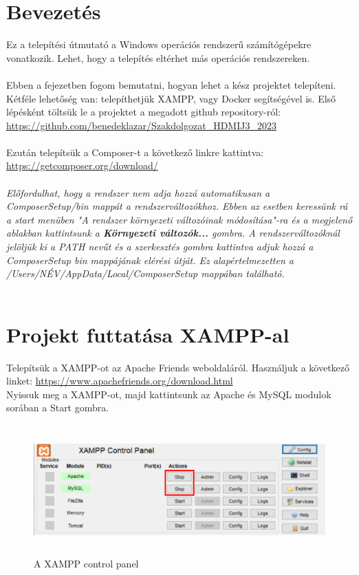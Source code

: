 \documentclass[
]{thesis-ekf}
\theoremstyle{definition}
\theoremstyle{remark}
\begin{document}
\section{Bevezetés}
Ez a telepítési útmutató a Windows operációs rendszerű számítógépekre vonatkozik. Lehet, hogy a telepítés eltérhet más operációs rendszereken.
\\\\
Ebben a fejezetben fogom bemutatni, hogyan lehet a kész projektet telepíteni. Kétféle lehetőség van: telepíthetjük XAMPP, vagy Docker segítségével is.
\noindent
Első lépésként töltsük le a projektet a megadott github repository-ról:
\noindent
\vspace{3mm}
\\
\url{ https://github.com/benedeklazar/Szakdolgozat_HDMIJ3_2023}
\\
\vspace{2mm}
\\
\noindent
Ezután telepítsük a Composer-t a következő linkre kattintva:
\noindent
\vspace{3mm}
\\
\url{ https://getcomposer.org/download/}
\\
\vspace{2mm}
\\
\noindent
\textit{Előfordulhat, hogy a rendszer nem adja hozzá automatikusan a ComposerSetup/bin mappát a rendszerváltozókhoz. Ebben az esetben keressünk rá a start menüben "A rendszer környezeti változóinak módosítása"-ra és
a megjelenő ablakban kattintsunk a \textbf{Környezeti változók...} gombra.
A rendszerváltozóknál jelöljük ki a PATH nevűt és a szerkesztés gombra kattintva adjuk hozzá a ComposerSetup bin mappájának elérési útját. Ez alapértelmezetten a /Users/NÉV/AppData/Local/ComposerSetup mappában található.}
\\\\

\section{Projekt futtatása XAMPP-al}

Telepítsük a XAMPP-ot az Apache Friends weboldaláról. Használjuk a következő linket: \url{https://www.apachefriends.org/download.html}
\\
Nyissuk meg a XAMPP-ot, majd kattintsunk az Apache és MySQL modulok sorában a Start gombra.

\begin{figure}[H]
	\centering
	\includegraphics[width=13cm, height=5cm]{xampp}
	\caption{A XAMPP control panel}
	\label{fig:picture}
\end{figure}
\end{document}
